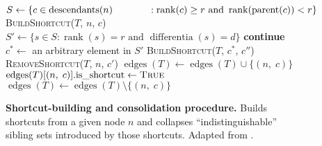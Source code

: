 \begin{figure}[htb]
\centering
\begin{minipage}{0.7\linewidth}
\begin{algorithm}[H]
\begin{algorithmic}[l]
  \small{
      \State $S \gets \{c \in \operatorname{descendants}(n) \\~~~~~~~~~~~: \operatorname{rank}(c) \ge r \text{ and }  \operatorname{rank}(\operatorname{parent}(c)) < r\}$
        \textsc{BuildShortcut}($T$, $n$, $c$)
      \EndFor
        \State $S' \gets \{s \in S : \operatorname{rank}(s) = r \text{ and } \operatorname{differentia}(s) = d\}$
          \State \textbf{continue}
        \EndIf
        \State $c^* \gets$ an arbitrary element in $S'$
            \State \textsc{BuildShortcut}($T$, $c^*$, $c''$)
          \EndFor
          \State \textsc{RemoveShortcut}($T$, $n$, $c'$)
        \EndFor
      \EndFor
    \EndFunction
      \State $\operatorname{edges}(T) \gets \operatorname{edges}(T) \cup \{(n,\; c)\}$
      \State $\operatorname{edges}(T)[(n,\; c)]\text{.is\_shortcut} \gets \textsc{True}$
    \EndFunction
        \State $\operatorname{edges}(T) \gets \operatorname{edges}(T) \setminus \{(n,\; c)\}$
    \EndFunction
  }
  \end{algorithmic}
\caption{\textbf{Shortcut-building and consolidation procedure.}
\footnotesize
Builds shortcuts from a given node $n$ and collapses ``indistinguishable'' sibling sets introduced by those shortcuts.
Adapted from \citet{singhvi2025scalable}.
}
  \label{alg:consolidation}
\end{algorithm}
\end{minipage}
\end{figure}
